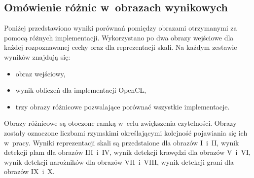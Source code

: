 \subsection{Omówienie różnic w~obrazach wynikowych}
\label{subsec:prezentacjaObrazowRoznicowych}

Poniżej przedstawiono wyniki porównań pomiędzy obrazami otrzymanymi za pomocą różnych implementacji. Wykorzystano po dwa obrazy wejściowe dla każdej rozpoznawanej cechy oraz dla reprezentacji skali. Na każdym zestawie wyników znajdują się:
\begin{itemize}
\item obraz wejściowy,
\item wynik obliczeń dla implementacji OpenCL,
\item trzy obrazy różnicowe pozwalające porównać wszystkie implementacje.
\end{itemize}

Obrazy różnicowe są otoczone ramką w~celu zwiększenia czytelności. Obrazy zostały oznaczone liczbami rzymskimi określającymi kolejność pojawiania się ich w~pracy. Wyniki reprezentacji skali są przedstaione dla obrazów I~i~II, wynik detekcji plam dla obrazów III~i~IV, wynik detekcji krawędzi dla obrazów V~i~VI, wynik detekcji narożników dla obrazów VII~i~VIII, wynik detekcji grani dla obrazów IX~i~X.

